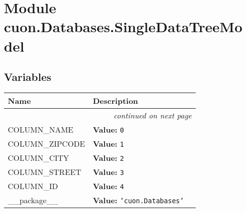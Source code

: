 %
%
%


\section{Module cuon.Databases.SingleDataTreeModel}

    \label{cuon:Databases:SingleDataTreeModel}


  \subsection{Variables}

    \vspace{-1cm}
\hspace{\varindent}\begin{longtable}{|p{\varnamewidth}|p{\vardescrwidth}|l}
\cline{1-2}
\cline{1-2} \centering \textbf{Name} & \centering \textbf{Description}& \\
\cline{1-2}
\endhead\cline{1-2}\multicolumn{3}{r}{\small\textit{continued on next page}}\\\endfoot\cline{1-2}
\endlastfoot\raggedright C\-O\-L\-U\-M\-N\-\_\-N\-A\-M\-E\- & \raggedright \textbf{Value:} 
{\tt 0}&\\
\cline{1-2}
\raggedright C\-O\-L\-U\-M\-N\-\_\-Z\-I\-P\-C\-O\-D\-E\- & \raggedright \textbf{Value:} 
{\tt 1}&\\
\cline{1-2}
\raggedright C\-O\-L\-U\-M\-N\-\_\-C\-I\-T\-Y\- & \raggedright \textbf{Value:} 
{\tt 2}&\\
\cline{1-2}
\raggedright C\-O\-L\-U\-M\-N\-\_\-S\-T\-R\-E\-E\-T\- & \raggedright \textbf{Value:} 
{\tt 3}&\\
\cline{1-2}
\raggedright C\-O\-L\-U\-M\-N\-\_\-I\-D\- & \raggedright \textbf{Value:} 
{\tt 4}&\\
\cline{1-2}
\raggedright \_\-\_\-p\-a\-c\-k\-a\-g\-e\-\_\-\_\- & \raggedright \textbf{Value:} 
{\tt \texttt{'}\texttt{cuon.Databases}\texttt{'}}&\\
\cline{1-2}
\end{longtable}


